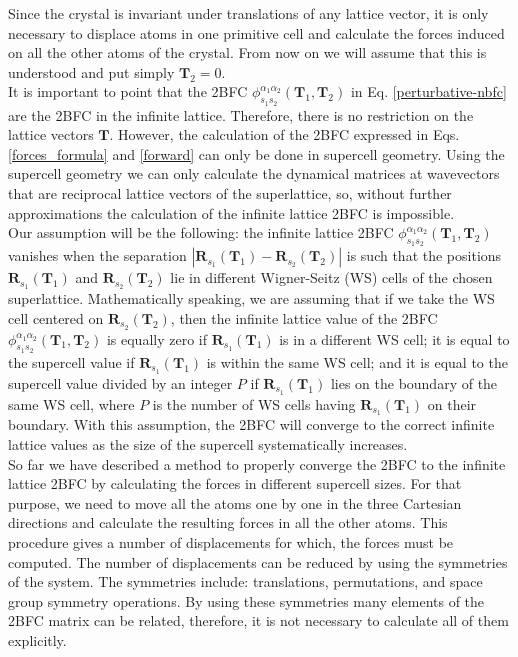 Since the crystal is invariant under translations of any lattice vector, it is only necessary to displace atoms in 
one primitive cell and calculate the forces induced on all the other atoms of the crystal. From now on we will 
assume that this is understood and put simply $\mathbf{T}_{2}=0$. \\

It is important to point that the 2BFC 
$\phi_{s_{1}s_{2}}^{\alpha_{1}\alpha_{2}}(\mathbf{T}_{1},\mathbf{T}_{2})$ in Eq. \ref{perturbative-nbfc} are the 
2BFC in the infinite lattice. Therefore, there is no restriction on the lattice vectors $\mathbf{T}$. However, the 
calculation of the 2BFC expressed in Eqs. \ref{forces_formula} and \ref{forward} can only be done in supercell 
geometry. Using the supercell geometry we can only calculate the dynamical matrices at wavevectors that are 
reciprocal lattice vectors of the superlattice, so, without further approximations the calculation of the infinite 
lattice 2BFC is impossible. \\

Our assumption will be the following: the infinite lattice 2BFC 
$\phi_{s_{1}s_{2}}^{\alpha_{1}\alpha_{2}}(\mathbf{T}_{1},\mathbf{T}_{2})$ vanishes when the separation 
$|\mathbf{R}_{s_{1}}(\mathbf{T}_{1})-\mathbf{R}_{s_{2}}(\mathbf{T}_{2})|$ is such that the positions 
$\mathbf{R}_{s_{1}}(\mathbf{T}_{1})$ and $\mathbf{R}_{s_{2}}(\mathbf{T}_{2})$ lie in different Wigner-Seitz (WS) 
cells\cite{ashcroft1976solid} of the chosen superlattice. Mathematically speaking, we are assuming that if we 
take the WS cell centered on $\mathbf{R}_{s_{2}}(\mathbf{T}_{2})$, then the infinite lattice value of the 2BFC 
$\phi_{s_{1}s_{2}}^{\alpha_{1}\alpha_{2}}(\mathbf{T}_{1},\mathbf{T}_{2})$ is equally zero if 
$\mathbf{R}_{s_{1}}(\mathbf{T}_{1})$ is in a different WS cell; it is equal to the supercell value if 
$\mathbf{R}_{s_{1}}(\mathbf{T}_{1})$ is within the same WS cell; and it is equal to the supercell value divided by 
an integer $P$ if $\mathbf{R}_{s_{1}}(\mathbf{T}_{1})$ lies on the boundary of the same WS cell, where $P$ 
is the number of WS cells having $\mathbf{R}_{s_{1}}(\mathbf{T}_{1})$ on their boundary. With this assumption, the 
2BFC will converge to the correct infinite lattice values as the size of the supercell systematically increases. \\

So far we have described a method to properly converge the 2BFC to the infinite lattice 2BFC by calculating the 
forces in different supercell sizes. For that purpose, we need to move all the atoms one by one in the three Cartesian directions and calculate the resulting forces in all the other atoms. This procedure gives a number of displacements for which, the forces must be computed. The number of displacements can be reduced by using the symmetries of the system. The symmetries include: translations, permutations, and space group symmetry operations. By using these symmetries many elements of the 2BFC matrix can be related, therefore, it is not necessary to calculate all of them explicitly. \\ 

